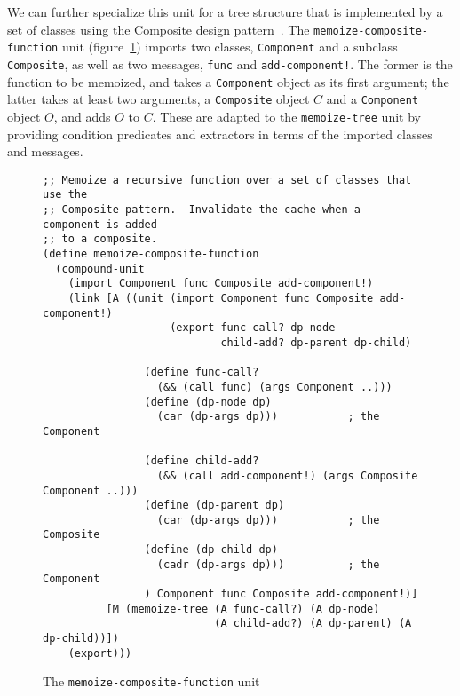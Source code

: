 \documentclass{article}
\newcommand{\code}[1]{\texttt{#1}}
\begin{document}
We can further specialize this unit for a tree structure that is
implemented by a set of classes using the Composite design
pattern~\cite{design-patterns}.  The \code{memoize-composite-function}
unit (figure~\ref{memoize-composite-function}) imports two classes,
\code{Component} and a subclass \code{Composite}, as well as two
messages, \code{func} and \code{add-component!}.  The former is the
function to be memoized, and takes a \code{Component} object as its
first argument; the latter takes at least two arguments, a
\code{Composite} object $C$ and a \code{Component} object $O$, and
adds $O$ to $C$.  These are adapted to the \code{memoize-tree} unit by
providing condition predicates and extractors in terms of the imported
classes and messages.

\begin{figure}
\caption{The \code{memoize-composite-function} unit}
\label{memoize-composite-function}
\begin{verbatim}
;; Memoize a recursive function over a set of classes that use the
;; Composite pattern.  Invalidate the cache when a component is added
;; to a composite.
(define memoize-composite-function
  (compound-unit
    (import Component func Composite add-component!)
    (link [A ((unit (import Component func Composite add-component!)
                    (export func-call? dp-node
                            child-add? dp-parent dp-child)

                (define func-call?
                  (&& (call func) (args Component ..)))
                (define (dp-node dp)
                  (car (dp-args dp)))           ; the Component

                (define child-add?
                  (&& (call add-component!) (args Composite Component ..)))
                (define (dp-parent dp)
                  (car (dp-args dp)))           ; the Composite
                (define (dp-child dp)
                  (cadr (dp-args dp)))          ; the Component
                ) Component func Composite add-component!)]
          [M (memoize-tree (A func-call?) (A dp-node)
                           (A child-add?) (A dp-parent) (A dp-child))])
    (export)))
\end{verbatim}
\end{figure}
\end{document}
